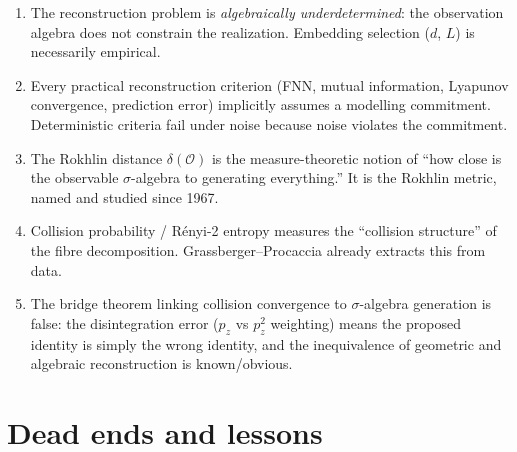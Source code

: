 \begin{enumerate}
  \item The reconstruction problem is \emph{algebraically
    underdetermined}: the observation algebra does not constrain
    the realization.  Embedding selection ($d$, $L$) is necessarily
    empirical.

  \item Every practical reconstruction criterion (FNN, mutual
    information, Lyapunov convergence, prediction error) implicitly
    assumes a modelling commitment.  Deterministic criteria fail under noise because
    noise violates the commitment.

  \item The Rokhlin distance $\delta(\mathcal{O})$ is the
    measure-theoretic notion of ``how close is the observable
    $\sigma$-algebra to generating everything.''  It is the
    Rokhlin metric, named and studied since 1967.

  \item Collision probability / R\'{e}nyi-2 entropy measures
    the ``collision structure'' of the fibre decomposition.
    Grassberger--Procaccia already extracts this from data.

  \item The bridge theorem linking collision convergence to
    $\sigma$-algebra generation is false: the disintegration error
    ($p_z$ vs $p_z^2$ weighting) means the proposed identity is
    simply the wrong identity, and the inequivalence of geometric
    and algebraic reconstruction is known/obvious.
\end{enumerate}

\section{Dead ends and lessons}
\label{sec:dead-ends}

